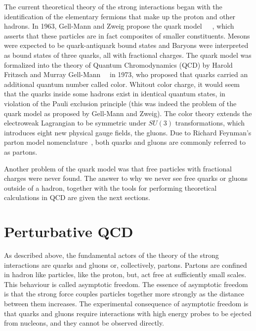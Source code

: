 The current theoretical theory of the strong interactions began with the identification of the elementary fermions that make up the proton and other hadrons. In 1963, Gell-Mann and Zweig propose the quark model~\cite{GellMann1964214}~\cite{Zweig:1964j}~\cite{Zweig2}, which asserts that these particles are in fact composites of smaller constituents.  Mesons were expected to be quark-antiquark bound states and Baryons were interpreted as bound states of three quarks, all with fractional charges. 
The quark model was formalized into the theory of Quantum Chromodynamics (QCD) by Harold Fritzsch and Murray Gell-Mann~\cite{Current Algebra}~\cite{Fritzsch1973365} in 1973, who proposed that quarks carried an additional quantum number called color.  Whitout color charge, it would seem that the quarks inside some hadrons exist in identical quantum states, in violation of the Pauli exclusion principle (this was indeed the problem of the quark model as proposed by Gell-Mann and Zweig). The color theory extends the electroweak Lagrangian to be symmetric under $SU(3)$ transformations, which introduces eight new physical gauge fields, the gluons. Due to
Richard Feynman's parton model nomenclature~\cite{PhysRevLett.23.1415}, both quarks and gluons are commonly referred to as partons.

Another problem of the quark model was that free particles with fractional charges were never found. The answer to why  we never see free quarks or gluons outside of a hadron, together with the tools for performing theoretical calculations in QCD are given the next sections.



\section{Perturbative QCD}\label{sec:qcd}


As described above, the fundamental actors of the theory of the strong interactions are quarks and gluons or, collectively, partons. Partons are confined in hadron like particles, like the proton, but, act free at sufficiently small scales. This behaviour is called asymptotic freedom. The essence of asymptotic freedom is that the strong force couples particles together more strongly as the distance between them increases. The experimental consequence of asymptotic freedom is that quarks and gluons require interactions with high energy probes to be ejected from nucleons, and they cannot be observed directly. 

